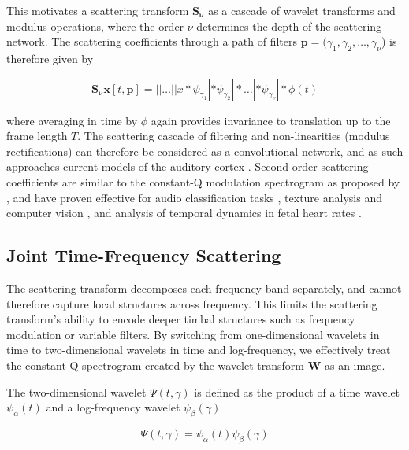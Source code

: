 This motivates a scattering transform $\mathbf{S_\nu}$ as a cascade of wavelet transforms and modulus operations, where the order $\nu$ determines the depth of the scattering network. The scattering coefficients through a path of filters $\mathbf{p} = (\gamma_1, \gamma_2, \dots, \gamma_{\nu}$) is therefore given by 

\begin{equation}
\mathbf{S_{\nu}x}[t, \mathbf{p}] = || \dots || x \ast \psi_{\gamma_1} | \ast \psi_{\gamma_2} | \ast \dots | \ast \psi_{\gamma_{\nu}} | \ast \phi(t)
\end{equation}

where averaging in time by $\phi$ again provides invariance to translation up to the frame length $T$. The scattering cascade of filtering and non-linearities (modulus rectifications) can therefore be considered as a convolutional network, and as such approaches current models of the auditory cortex \cite{chi2005multiresolution}. Second-order scattering coefficients are similar to the constant-Q modulation spectrogram as proposed by \cite{thompson2003nonuniform}, and have proven effective for audio classification tasks \cite{anden2014deep}, texture analysis and computer vision \cite{bruna2011classification}, and analysis of temporal dynamics in fetal heart rates \cite{chudacek2014scattering}.

\subsection{Joint Time-Frequency Scattering}
\label{sec:timefrequencyscattering}

The scattering transform decomposes each frequency band separately, and cannot therefore capture local structures across frequency. This limits the scattering transform's ability to encode deeper timbal structures such as frequency modulation or variable filters. By switching from one-dimensional wavelets in time to two-dimensional wavelets in time and log-frequency, we effectively treat the constant-Q spectrogram created by the wavelet transform $\mathbf{W}$ as an image.

The two-dimensional wavelet $\Psi(t,\gamma)$ is defined as the product of a time wavelet $\psi_{\alpha}(t)$ and a log-frequency wavelet $\psi_{\beta}(\gamma)$

\begin{equation}
\Psi(t,\gamma) = \psi_{\alpha}(t) \psi_{\beta}(\gamma)
\end{equation}

